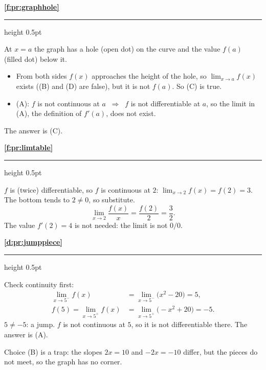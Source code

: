 \documentclass[11pt,a4paper]{article}
\newcommand{\solitem}[2]{%
 \par\addvspace{16pt}\Needspace{10\baselineskip}%
 {\large\bfseries \ref{#1}}\par\nobreak\vspace{2pt}%
 {\color{rulegray}\hrule height 0.5pt}\nobreak\vspace{7pt}%
 #2\par}
\newcommand{\imp}{\ \Longrightarrow\ }
\begin{document}
\solitem{f:pr:graphhole}{%
At $x=a$ the graph has a hole (open dot) on the curve and the value $f(a)$ (filled dot) below it.
\begin{itemize}
 \item From both sides $f(x)$ approaches the height of the hole, so $\displaystyle\lim_{x\to a}f(x)$ exists ((B) and (D) are false), but it is not $f(a)$. So (C) is true.
 \item (A): $f$ is not continuous at $a$ $\imp$ $f$ is not differentiable at $a$, so the limit in (A), the definition of $f'(a)$, does not exist.
\end{itemize}
The answer is (C).
}

\solitem{f:pr:limtable}{%
$f$ is (twice) differentiable, so $f$ is continuous at $2$: $\displaystyle\lim_{x\to2}f(x)=f(2)=3$. The bottom tends to $2\ne0$, so substitute.
\[
\lim_{x\to2}\frac{f(x)}{x}=\frac{f(2)}{2}=\frac32.
\]
The value $f'(2)=4$ is not needed: the limit is not $0/0$.
}

\solitem{d:pr:jumppiece}{%
Check continuity first:
\begin{align*}
\lim_{x\to5^-}f(x)&=\lim_{x\to5^-}\bigl(x^2-20\bigr)=5,\\
f(5)=\lim_{x\to5^+}f(x)&=\lim_{x\to5^+}\bigl(-x^2+20\bigr)=-5.
\end{align*}
$5\ne-5$: a jump. $f$ is not continuous at $5$, so it is not differentiable there. The answer is (A).

Choice (B) is a trap: the slopes $2x=10$ and $-2x=-10$ differ, but the pieces do not meet, so the graph has no corner.
}
\end{document}
